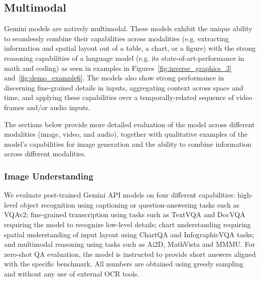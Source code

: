 \clearpage
\subsection{Multimodal}
\label{sec:mm}
Gemini models are natively multimodal. These models exhibit the unique ability to seamlessly combine their capabilities across modalities (e.g. extracting information and spatial layout out of a table, a chart, or a figure) with the strong reasoning capabilities of a language model 
(e.g. its state-of-art-performance in math and coding) as seen in examples in Figures~\ref{fig:inverse_graphics_3} and~\ref{fig:demo_example6}. 
The models also show strong performance in discerning fine-grained details in inputs, aggregating context across space and time, and applying these capabilities over a temporally-related sequence of video frames and/or audio inputs. 

The sections below provide more detailed evaluation of the model across different modalities (image, video, and audio), together with qualitative examples of the model's capabilities for image generation and the ability to combine information across different modalities. 

\subsubsection{Image Understanding}
\label{sec:image}
We evaluate post-trained Gemini API models on four different capabilities: high-level object recognition using captioning or question-answering tasks such as VQAv2; fine-grained transcription using tasks such as TextVQA and DocVQA requiring the model to recognize low-level details; chart understanding requiring spatial understanding of input layout using ChartQA and InfographicVQA tasks; and multimodal reasoning using tasks such as Ai2D, MathVista and MMMU. For zero-shot QA evaluation, the model is instructed to provide short answers aligned with the specific benchmark. All numbers are obtained using greedy sampling and without any use of external OCR tools. 


